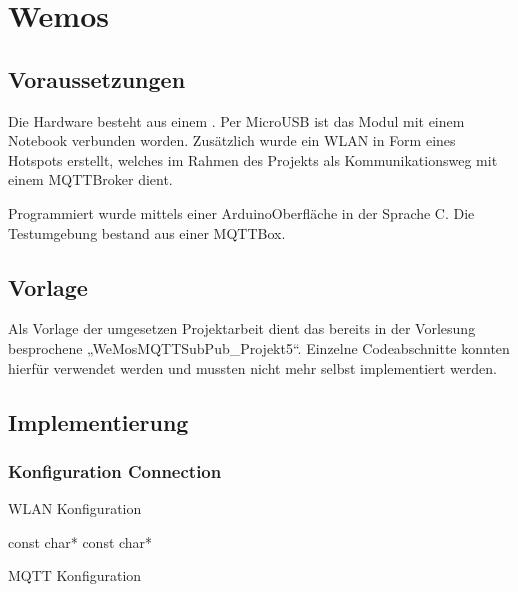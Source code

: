 \documentclass[a4paper,11pt,openany,oneside,ngerman]{sphinxmanual}
\begin{document}
\chapter{Wemos}
\label{\detokenize{wemos:wemos}}\label{\detokenize{wemos::doc}}

\section{Voraussetzungen}
\label{\detokenize{wemos:voraussetzungen}}
Die Hardware besteht aus einem . Per MicroUSB
ist das Modul mit einem Notebook verbunden worden. Zusätzlich wurde ein WLAN
in Form eines Hotspots erstellt, welches im Rahmen des Projekts als
Kommunikationsweg mit einem MQTT\sphinxhyphen{}Broker dient.

Programmiert wurde mittels einer Arduino\sphinxhyphen{}Oberfläche in der Sprache C. Die
Testumgebung bestand aus einer MQTTBox.


\section{Vorlage}
\label{\detokenize{wemos:vorlage}}
Als Vorlage der umgesetzen Projektarbeit dient das bereits in der Vorlesung
besprochene „WeMosMQTTSubPub\_Projekt5“. Einzelne Codeabschnitte konnten
hierfür verwendet werden und mussten nicht mehr selbst implementiert werden.


\section{Implementierung}
\label{\detokenize{wemos:implementierung}}

\subsection{Konfiguration Connection}
\label{\detokenize{wemos:konfiguration-connection}}
WLAN Konfiguration

\begin{sphinxVerbatim}[commandchars=\\\{\}]
const char*   
const char*   
\end{sphinxVerbatim}

MQTT Konfiguration
\end{document}
